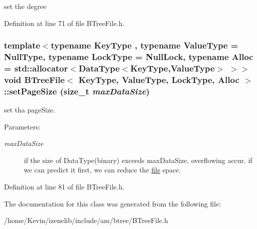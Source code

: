 set the degree 

Definition at line 71 of file BTreeFile.h.\hypertarget{classBTreeFile_b158c5e0ae96fd9cfb74813f984c1117}{
\subsubsection[{setPageSize}]{\setlength{\rightskip}{0pt plus 5cm}template$<$typename KeyType , typename ValueType  = NullType, typename LockType  = NullLock, typename Alloc  = std::allocator$<$DataType$<$KeyType,ValueType$>$ $>$$>$ void {\bf BTreeFile}$<$ KeyType, ValueType, LockType, Alloc $>$::setPageSize (size\_\-t {\em maxDataSize})}}
\label{classBTreeFile_b158c5e0ae96fd9cfb74813f984c1117}


set tha pageSize. 

\begin{Desc}
\item[Parameters:]
\begin{description}
\item[{\em maxDataSize}]if the size of DataType(binary) exceeds maxDataSize, overflowing accur. if we can predict it first, we can reduce the \hyperlink{classfile}{file} space. \end{description}
\end{Desc}


Definition at line 81 of file BTreeFile.h.

The documentation for this class was generated from the following file:\begin{CompactItemize}
\item 
/home/Kevin/izenelib/include/am/btree/BTreeFile.h\end{CompactItemize}
